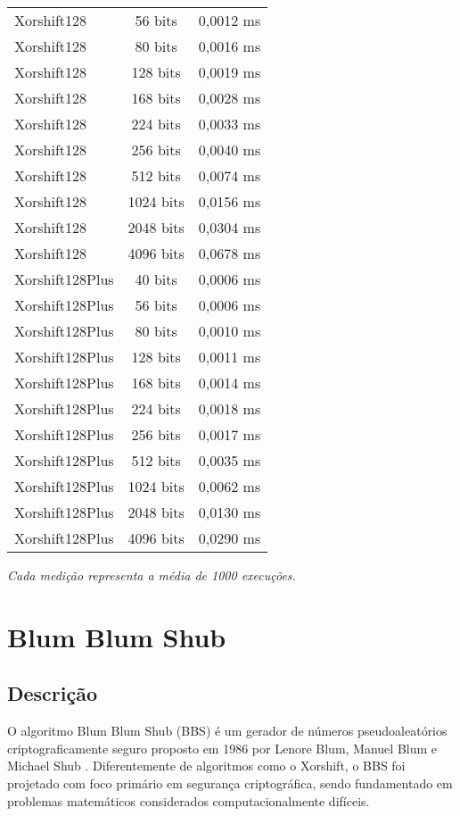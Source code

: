 \begin{table}[H]
\begin{tabular}{|l|c|c|}
Xorshift128 & 56 bits & 0,0012 ms \\
Xorshift128 & 80 bits & 0,0016 ms \\
Xorshift128 & 128 bits & 0,0019 ms \\
Xorshift128 & 168 bits & 0,0028 ms \\
Xorshift128 & 224 bits & 0,0033 ms \\
Xorshift128 & 256 bits & 0,0040 ms \\
Xorshift128 & 512 bits & 0,0074 ms \\
Xorshift128 & 1024 bits & 0,0156 ms \\
Xorshift128 & 2048 bits & 0,0304 ms \\
Xorshift128 & 4096 bits & 0,0678 ms \\
\hline
Xorshift128Plus & 40 bits & 0,0006 ms \\
Xorshift128Plus & 56 bits & 0,0006 ms \\
Xorshift128Plus & 80 bits & 0,0010 ms \\
Xorshift128Plus & 128 bits & 0,0011 ms \\
Xorshift128Plus & 168 bits & 0,0014 ms \\
Xorshift128Plus & 224 bits & 0,0018 ms \\
Xorshift128Plus & 256 bits & 0,0017 ms \\
Xorshift128Plus & 512 bits & 0,0035 ms \\
Xorshift128Plus & 1024 bits & 0,0062 ms \\
Xorshift128Plus & 2048 bits & 0,0130 ms \\
Xorshift128Plus & 4096 bits & 0,0290 ms \\
\hline
\end{tabular}
\end{table}

\textit{Cada medição representa a média de 1000 execuções.}

\section{Blum Blum Shub}

\subsection{Descrição}

O algoritmo Blum Blum Shub (BBS) é um gerador de números pseudoaleatórios criptograficamente seguro proposto em 1986 por Lenore Blum, Manuel Blum e Michael Shub \cite{blum1986simple}. Diferentemente de algoritmos como o Xorshift, o BBS foi projetado com foco primário em segurança criptográfica, sendo fundamentado em problemas matemáticos considerados computacionalmente difíceis.

